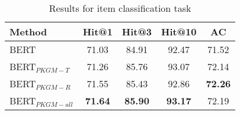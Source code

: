 \begin{table}[!hbpt]
    \centering
    \caption{Results for item classification task}
    \begin{tabular}{l|c | c |c | c}
    \toprule
         Method & Hit@1 &  Hit@3 & Hit@10 & AC  \\
          \midrule
          BERT & 71.03 & 84.91 & 92.47 & 71.52 \\
         BERT$_{PKGM-T}$ & 71.26 & 85.76 & 93.07 & 72.14\\
         BERT$_{PKGM-R}$ & 71.55 & 85.43 & 92.86 & \textbf{72.26}\\
         BERT$_{PKGM-all}$ & \textbf{71.64} & \textbf{85.90} & \textbf{93.17} & 72.19\\
        \bottomrule
    \end{tabular}
    \label{res:classification}
\end{table}
